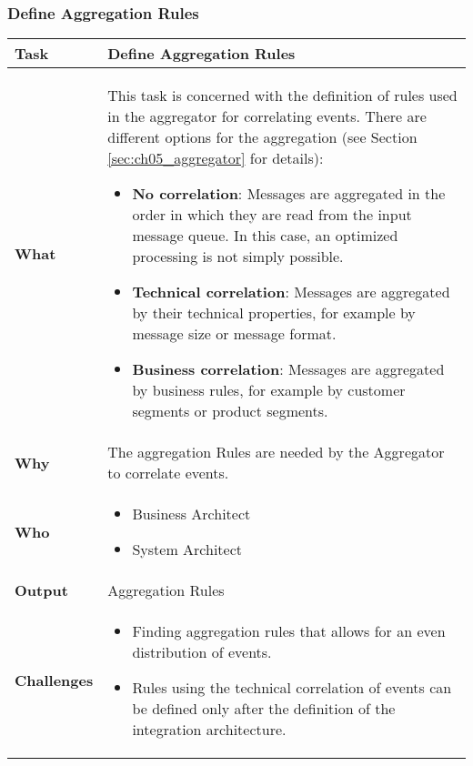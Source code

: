 \subsubsection{Define Aggregation Rules}
\begin{tabularx}{\textwidth}{@{} l X @{}}
	\caption{Define Aggregation Rules} \label{table:ch6_Task_Define_Aggregation_Rules}\\
	\toprule
	\bfseries Task & Define Aggregation Rules\\
	\midrule
	\bfseries What &
	This task is concerned with the definition of rules used in the aggregator for correlating events. There are different options for the aggregation (see Section \ref{sec:ch05_aggregator} for details):
\begin{itemize}
	\item \textbf{No correlation}: Messages are aggregated in the order in which they are read from the input message queue. In this case, an optimized processing is not simply possible.
	\item \textbf{Technical correlation}: Messages are aggregated by their technical properties, for example by message size or message format.
	\item \textbf{Business correlation}: Messages are aggregated by business rules, for example by customer segments or product segments.
\end{itemize}
	\\
	\midrule
	\bfseries Why & The aggregation Rules are needed by the Aggregator to correlate events.\\
	\midrule
	\bfseries Who & 
	\begin{itemize}
		\item Business Architect
		\item System Architect
	\end{itemize}
	\\
	\midrule
	\bfseries Output & Aggregation Rules\\
	\midrule
	\bfseries Challenges & 
	\begin{itemize}
		\item Finding aggregation rules that allows for an even distribution of events.
		\item Rules using the technical correlation of events can be defined only after the definition of the integration architecture.
	\end{itemize}\\
	\bottomrule 
\end{tabularx}

